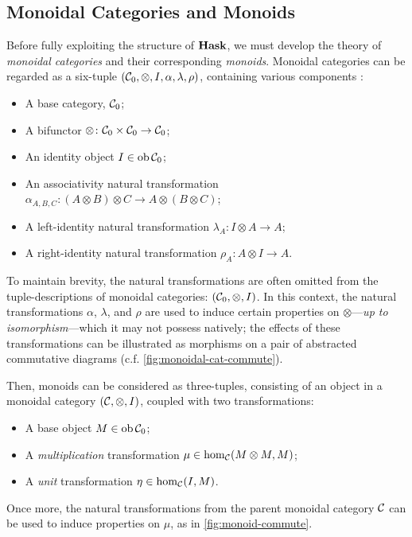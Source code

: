 \subsection{Monoidal Categories and Monoids}%
\label{sec:monoidal-categories}

Before fully exploiting the structure of $\operatorname{\mathbf{Hask}}$, we must develop the theory
of \emph{monoidal categories} and their corresponding \emph{monoids}. Monoidal
categories can be regarded as a six-tuple $(\mathcal{C}_0, \otimes, I, \alpha,
\lambda, \rho)$, containing various components \autocite{Kelly:1982}:
\begin{itemize}
        \item A base category, $\mathcal{C}_0$;

        \item A bifunctor $\otimes \colon \mathcal{C}_0 \times \mathcal{C}_0 \to
        \mathcal{C}_0$;

        \item An identity object $I \in \operatorname{ob} \mathcal{C}_0$;

        \item An associativity natural transformation $\alpha_{A,B,C} \colon (A
        \otimes B) \otimes C \to A \otimes (B \otimes C)$;

        \item A left-identity natural transformation $\lambda_A \colon I \otimes
        A \to A$;

        \item A right-identity natural transformation $\rho_A \colon A \otimes I
        \to A$.
\end{itemize}

To maintain brevity, the natural transformations are often omitted from the
tuple-descriptions of monoidal categories: $(\mathcal{C}_0, \otimes, I)$. In this
context, the natural transformations $\alpha$, $\lambda$, and $\rho$ are used to
induce certain properties on $\otimes$---\emph{up to isomorphism}---which it
may not possess natively; the effects of these transformations can be
illustrated as morphisms on a pair of abstracted commutative diagrams (c.f.
\autoref{fig:monoidal-cat-commute}).

Then, monoids can be considered as three-tuples, consisting of an object in a
monoidal category $(\mathcal{C}, \otimes, I)$, coupled with two transformations:
\begin{itemize}
        \item A base object $M \in \operatorname{ob} \mathcal{C}_0$;
        \item A \emph{multiplication} transformation $\mu \in \hom_\mathcal{C}
        (M \otimes M, M)$;
        \item A \emph{unit} transformation $\eta \in \hom_\mathcal{C} (I, M)$.
\end{itemize}
Once more, the natural transformations from the parent monoidal category
$\mathcal{C}$ can be used to induce properties on $\mu$, as in
\autoref{fig:monoid-commute}.


